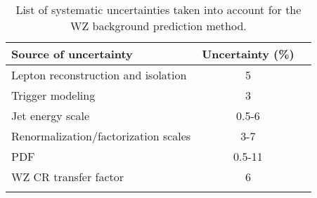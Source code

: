 \begin{table}[!hbtp]
\renewcommand{\arraystretch}{1.2}
\setlength{\belowcaptionskip}{6pt}
\small
\centering
\caption{List of systematic uncertainties taken into account for the WZ background prediction method.}
\begin{tabular}{l c c}
\hline\hline
Source of uncertainty                         & Uncertainty (\%)     \\
\hline
Lepton reconstruction and isolation     &      {5}                   \\ %
Trigger modeling                        &      {3}                   \\ %
Jet energy scale                        &      {0.5-6}                  \\ %
Renormalization/factorization scales    &      {3-7}                 \\ %
PDF                                     &      {0.5-11}                 \\ %
WZ CR transfer factor                   &      {6}                 \\ %
\hline\hline
\label{tab:systematicsWZ}
\end{tabular}
\end{table}



